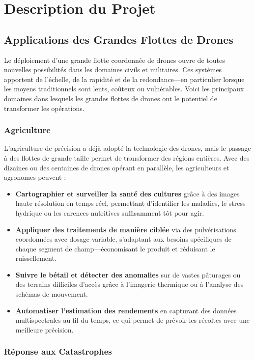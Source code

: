 \documentclass[a4paper,12pt]{article}
\begin{document}
\section*{Description du Projet}
\subsection*{Applications des Grandes Flottes de Drones}

Le déploiement d'une grande flotte coordonnée de drones ouvre de toutes nouvelles possibilités dans les domaines civils et militaires. Ces systèmes apportent de l’échelle, de la rapidité et de la redondance—en particulier lorsque les moyens traditionnels sont lents, coûteux ou vulnérables. Voici les principaux domaines dans lesquels les grandes flottes de drones ont le potentiel de transformer les opérations.

\subsubsection*{Agriculture}

L’agriculture de précision a déjà adopté la technologie des drones, mais le passage à des flottes de grande taille permet de transformer des régions entières. Avec des dizaines ou des centaines de drones opérant en parallèle, les agriculteurs et agronomes peuvent :
\begin{itemize}
    \item \textbf{Cartographier et surveiller la santé des cultures} grâce à des images haute résolution en temps réel, permettant d’identifier les maladies, le stress hydrique ou les carences nutritives suffisamment tôt pour agir.
    \item \textbf{Appliquer des traitements de manière ciblée} via des pulvérisations coordonnées avec dosage variable, s’adaptant aux besoins spécifiques de chaque segment de champ—économisant le produit et réduisant le ruissellement.
    \item \textbf{Suivre le bétail et détecter des anomalies} sur de vastes pâturages ou des terrains difficiles d’accès grâce à l’imagerie thermique ou à l’analyse des schémas de mouvement.
    \item \textbf{Automatiser l’estimation des rendements} en capturant des données multispectrales au fil du temps, ce qui permet de prévoir les récoltes avec une meilleure précision.
\end{itemize}

\subsubsection*{Réponse aux Catastrophes}
\end{document}
